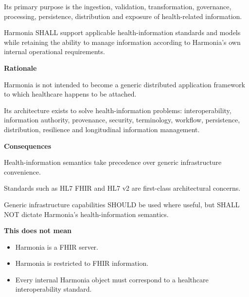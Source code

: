 Its primary purpose is the ingestion, validation, transformation,
governance, processing, persistence, distribution and exposure of
health-related information.



Harmonia SHALL support applicable health-information standards and
models while retaining the ability to manage information according to
Harmonia's own internal operational requirements.



\par\medskip\textbf{Rationale}\par


Harmonia is not intended to become a generic distributed application
framework to which healthcare happens to be attached.



Its architecture exists to solve health-information problems:
interoperability, information authority, provenance, security,
terminology, workflow, persistence, distribution, resilience and
longitudinal information management.



\par\medskip\textbf{Consequences}\par


Health-information semantics take precedence over generic infrastructure
convenience.



Standards such as HL7 FHIR and HL7 v2 are first-class architectural
concerns.



Generic infrastructure capabilities SHOULD be used where useful, but
SHALL NOT dictate Harmonia's health-information semantics.



\textbf{This does not mean}



\begin{itemize}


\item Harmonia is a FHIR server.

\item Harmonia is restricted to FHIR information.

\item Every internal Harmonia object must correspond to a healthcare interoperability standard.

\end{itemize}

